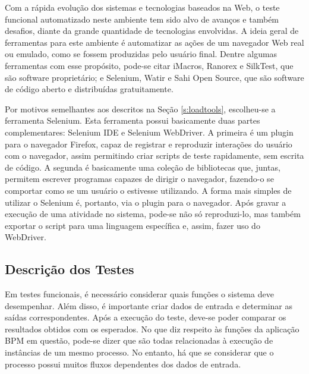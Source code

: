 \documentclass[12pt]{article}
\begin{document}
Com a rápida evolução dos sistemas e tecnologias baseados na Web, o teste funcional automatizado neste ambiente tem sido alvo de avanços e também desafios, diante da grande quantidade de tecnologias envolvidas. A ideia geral de ferramentas para este ambiente é automatizar as ações de um navegador Web real ou emulado, como se fossem produzidas pelo usuário final. Dentre algumas ferramentas com esse propósito, pode-se citar iMacros, Ranorex e SilkTest, que são software proprietário; e Selenium, Watir e Sahi Open Source, que são software de código aberto e distribuídas gratuitamente.


Por motivos semelhantes aos descritos na Seção \ref{s:loadtools}, escolheu-se a ferramenta Selenium. Esta ferramenta possui basicamente duas partes complementares: Selenium IDE e Selenium WebDriver. A primeira é um plugin para o navegador Firefox, capaz de registrar e reproduzir interações do usuário com o navegador, assim permitindo criar scripts de teste rapidamente, sem escrita de código. A segunda é basicamente uma coleção de bibliotecas que, juntas, permitem escrever programas capazes de dirigir o navegador, fazendo-o se comportar como se um usuário o estivesse utilizando. A forma mais simples de utilizar o Selenium é, portanto, via o plugin para o navegador. Após gravar a execução de uma atividade no sistema, pode-se não só reproduzi-lo, mas também exportar o script para uma linguagem específica e, assim, fazer uso do WebDriver.






\subsection{Descrição dos Testes}


Em testes funcionais, é necessário considerar quais funções o sistema deve desempenhar. Além disso, é importante criar dados de entrada e determinar as saídas correspondentes. Após a execução do teste, deve-se poder comparar os resultados obtidos com os esperados. No que diz respeito às funções da aplicação BPM em questão, pode-se dizer que são todas relacionadas à execução de instâncias de um mesmo processo. No entanto, há que se considerar que o processo possui muitos fluxos dependentes dos dados de entrada.
\end{document}
